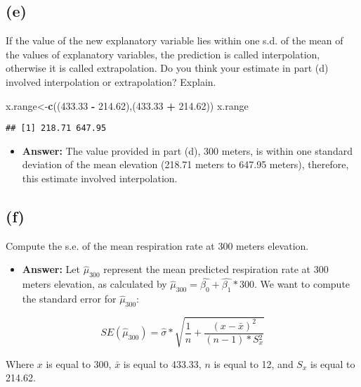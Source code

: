 \documentclass[]{article}
\newenvironment{Shaded}{\begin{snugshade}}{\end{snugshade}}
\newcommand{\KeywordTok}[1]{\textcolor[rgb]{0.13,0.29,0.53}{\textbf{#1}}}
\newcommand{\FloatTok}[1]{\textcolor[rgb]{0.00,0.00,0.81}{#1}}
\newcommand{\StringTok}[1]{\textcolor[rgb]{0.31,0.60,0.02}{#1}}
\newcommand{\OperatorTok}[1]{\textcolor[rgb]{0.81,0.36,0.00}{\textbf{#1}}}
\newcommand{\NormalTok}[1]{#1}
\providecommand{\tightlist}{%
  \setlength{\itemsep}{0pt}\setlength{\parskip}{0pt}}
\begin{document}
\subsection{(e)}\label{e}

If the value of the new explanatory variable lies within one s.d. of the
mean of the values of explanatory variables, the prediction is called
interpolation, otherwise it is called extrapolation. Do you think your
estimate in part (d) involved interpolation or extrapolation? Explain.

\begin{Shaded}
\begin{Highlighting}[]
\NormalTok{x.range<-}\KeywordTok{c}\NormalTok{((}\FloatTok{433.33} \OperatorTok{-}\StringTok{ }\FloatTok{214.62}\NormalTok{),(}\FloatTok{433.33} \OperatorTok{+}\StringTok{ }\FloatTok{214.62}\NormalTok{))}
\NormalTok{x.range}
\end{Highlighting}
\end{Shaded}

\begin{verbatim}
## [1] 218.71 647.95
\end{verbatim}

\begin{itemize}
\tightlist
\item
  \textbf{Answer:} The value provided in part (d), 300 meters, is within
  one standard deviation of the mean elevation (218.71 meters to 647.95
  meters), therefore, this estimate involved interpolation.
\end{itemize}

\subsection{(f)}\label{f}

Compute the s.e. of the mean respiration rate at 300 meters elevation.

\begin{itemize}
\tightlist
\item
  \textbf{Answer:} Let \(\hat{\mu}_{300}\) represent the mean predicted
  respiration rate at 300 meters elevation, as calculated by
  \(\hat{\mu}_{300} = \hat{\beta_0} + \hat{\beta_1}*300\). We want to
  compute the standard error for \(\hat{\mu}_{300}\):
\end{itemize}

\[
SE(\hat{\mu}_{300}) = \hat{\sigma} * \sqrt{\frac{1}{n} + \frac{(x-\bar{x})^2}{(n-1)*S{_x^2}}}
\]

Where \(x\) is equal to 300, \(\bar{x}\) is equal to 433.33, \(n\) is
equal to 12, and \(S_x\) is equal to 214.62.
\end{document}
